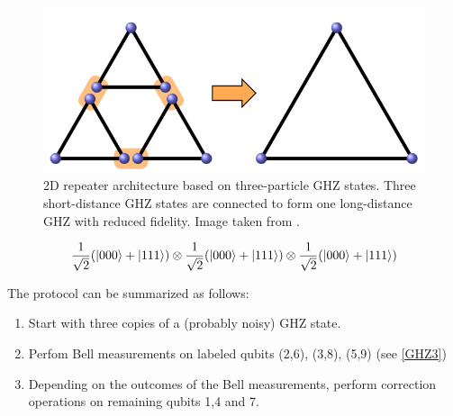 \documentclass[10pt,a4paper]{book}
\numberwithin{equation}{chapter}
\numberwithin{figure}{chapter}
\numberwithin{table}{chapter}
\begin{document}
\begin{figure}[H]
    \begin{center}
        \includegraphics[scale=0.3]{CoarseGHZ3.png}
    \end{center}
    \caption{\footnotesize 2D repeater architecture based on three-particle GHZ states. Three short-distance GHZ states are connected to form one long-distance GHZ with reduced fidelity. Image taken from \cite{twodim}.}
    \label{CGHZ3}
\end{figure}

\begin{equation}
\frac{1}{\sqrt{2}}(\ket{000}+\ket{111})\otimes \frac{1}{\sqrt{2}}(\ket{000}+\ket{111})\otimes \frac{1}{\sqrt{2}}(\ket{000}+\ket{111})
\end{equation}

The protocol can be summarized as follows:
\begin{enumerate}
\item Start with three copies of a (probably noisy) GHZ state.
\item Perfom Bell measurements on labeled qubits (2,6), (3,8), (5,9) (see \autoref{GHZ3}) 
\item Depending on the outcomes of the Bell measurements, perform correction operations on remaining qubits 1,4 and 7.
\end{enumerate}
\end{document}
